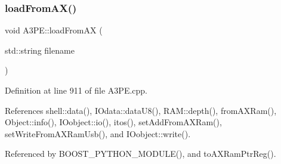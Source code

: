 \subsubsection{\texorpdfstring{load\+From\+A\+X()}{loadFromAX()}}
{\footnotesize\ttfamily void A3\+P\+E\+::load\+From\+AX (\begin{DoxyParamCaption}\item[{std\+::string}]{filename }\end{DoxyParamCaption})}



Definition at line 911 of file A3\+P\+E.\+cpp.



References shell\+::data(), I\+Odata\+::data\+U8(), R\+A\+M\+::depth(), from\+A\+X\+Ram(), Object\+::info(), I\+Oobject\+::io(), itos(), set\+Add\+From\+A\+X\+Ram(), set\+Write\+From\+A\+X\+Ram\+Usb(), and I\+Oobject\+::write().



Referenced by B\+O\+O\+S\+T\+\_\+\+P\+Y\+T\+H\+O\+N\+\_\+\+M\+O\+D\+U\+L\+E(), and to\+A\+X\+Ram\+Ptr\+Reg().


